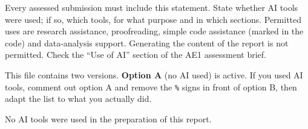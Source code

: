 \clearpage
{}

\begin{guidance}
Every assessed submission must include this statement. State whether AI
tools were used; if so, which tools, for what purpose and in which sections.
Permitted uses are research assistance, proofreading, simple code assistance
(marked in the code) and data-analysis support. Generating the content of
the report is not permitted. Check the \enquote{Use of AI} section of the
AE1 assessment brief.

This file contains two versions. \textbf{Option A} (no AI used) is active.
If you used AI tools, comment out option A and remove the \texttt{\%} signs
in front of option B, then adapt the list to what you actually did.
\end{guidance}

No AI tools were used in the preparation of this report.

